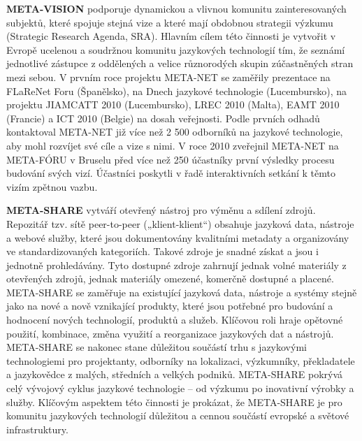 \begin{multicols}{2}
\textbf{META-VISION} podporuje dynamickou a vlivnou komunitu zainteresovaných subjektů, které spojuje stejná vize a které mají obdobnou strategii výzkumu (Strategic Research Agenda, SRA). Hlavním cílem této činnosti je vytvořit v Evropě ucelenou a soudržnou komunitu jazykových technologií tím, že seznámí jednotlivé zástupce z oddělených a velice různorodých skupin zúčastněných stran mezi sebou. V prvním roce projektu META-NET se zaměřily prezentace na FLaReNet Foru (Španělsko), na Dnech jazykové technologie (Lucembursko), na projektu JIAMCATT 2010 (Lucembursko), LREC 2010 (Malta), EAMT 2010 (Francie) a ICT 2010 (Belgie) na dosah veřejnosti. Podle prvních odhadů kontaktoval META-NET již více než 2 500 odborníků na jazykové technologie, aby mohl rozvíjet své cíle a vize s nimi. V roce 2010 zveřejnil META-NET na META-FÓRU v Bruselu před více než 250 účastníky první výsledky procesu budování svých vizí. Účastníci poskytli v řadě interaktivních setkání k těmto vizím zpětnou vazbu.

\textbf{META-SHARE} vytváří otevřený nástroj pro výměnu a sdílení zdrojů. Repozitář tzv. sítě peer-to-peer („klient-klient“) obsahuje jazyková data, nástroje a webové služby, které jsou dokumentovány kvalitními metadaty a organizovány ve standardizovaných kategoriích. Takové zdroje je snadné získat a jsou i jednotně prohledávány. Tyto dostupné zdroje zahrnují jednak volné materiály z otevřených zdrojů, jednak materiály omezené, komerčně dostupné a placené. META-SHARE se zaměřuje na existující jazyková data, nástroje a systémy stejně jako na nové a nově vznikající produkty, které jsou potřebné pro budování a hodnocení nových technologií, produktů a služeb. Klíčovou roli hraje opětovné použití, kombinace, změna využití a reorganizace jazykových dat a nástrojů. META-SHARE se nakonec stane důležitou součástí trhu s jazykovými technologiemi pro projektanty, odborníky na lokalizaci, výzkumníky, překladatele a jazykovědce z malých, středních a velkých podniků. META-SHARE pokrývá celý vývojový cyklus jazykové technologie – od výzkumu po inovativní výrobky a služby. Klíčovým aspektem této činnosti je prokázat, že META-SHARE je pro komunitu jazykových technologií důležitou a cennou součástí evropské a světové infrastruktury.


\end{multicols}
